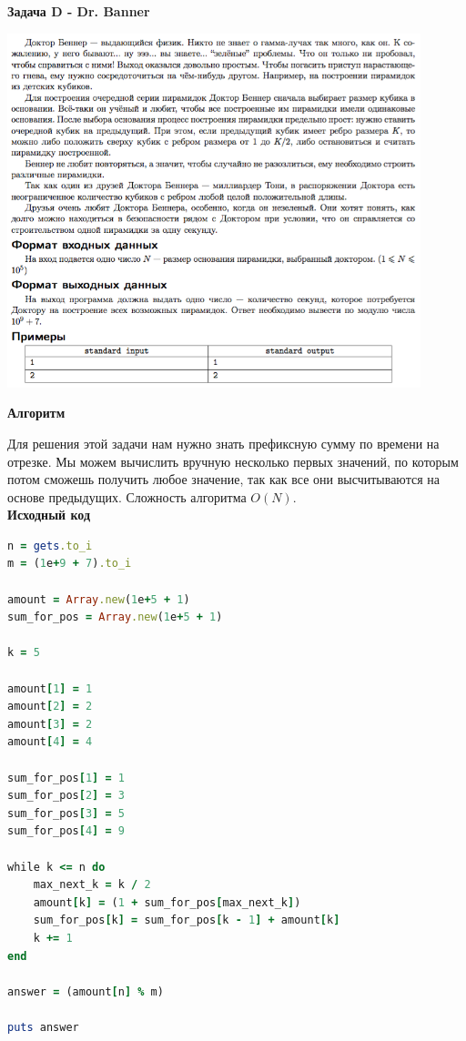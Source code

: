 \documentclass[a4paper,12pt]{article}
\begin{document}
\newpage
\textbf{{\large Задача D - Dr. Banner}}

\begin{center}
\includegraphics[width=0.9\textwidth]{OC_YKB/D.png}\\ [1cm]
\end{center}

\textbf{{\large Алгоритм}}

Для решения этой задачи нам нужно знать префиксную сумму по времени на отрезке. Мы можем вычислить вручную несколько первых значений, по которым потом сможешь получить любое значение, так как все они высчитываются на основе предыдущих. Сложность алгоритма $O(N)$. \\

\newpage
\textbf{{\large Исходный код}} \\
\begin{lstlisting}[language=Ruby]
n = gets.to_i
m = (1e+9 + 7).to_i

amount = Array.new(1e+5 + 1)
sum_for_pos = Array.new(1e+5 + 1)

k = 5

amount[1] = 1
amount[2] = 2
amount[3] = 2
amount[4] = 4

sum_for_pos[1] = 1
sum_for_pos[2] = 3
sum_for_pos[3] = 5
sum_for_pos[4] = 9

while k <= n do
    max_next_k = k / 2
    amount[k] = (1 + sum_for_pos[max_next_k])
    sum_for_pos[k] = sum_for_pos[k - 1] + amount[k]
    k += 1
end

answer = (amount[n] % m)

puts answer
\end{lstlisting}
\end{document}
